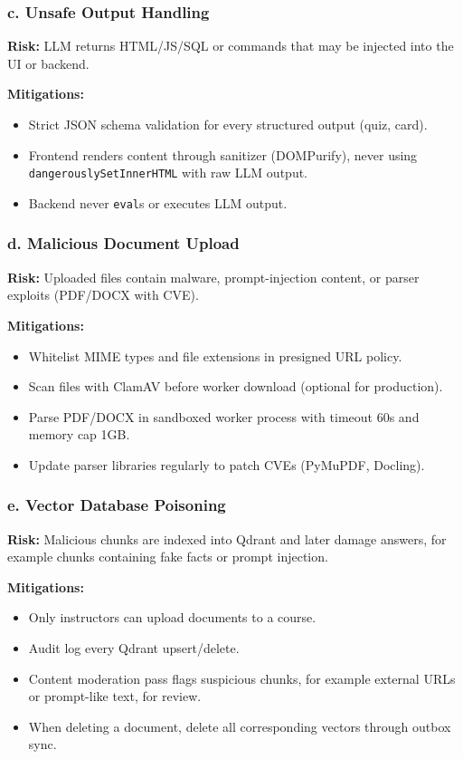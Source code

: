 \subsubsection*{c. Unsafe Output Handling}

\textbf{Risk:} LLM returns HTML/JS/SQL or commands that may be injected
into the UI or backend.

\textbf{Mitigations:}
\begin{itemize}
    \item Strict JSON schema validation for every structured output (quiz,
          card).
    \item Frontend renders content through sanitizer (DOMPurify), never
          using \texttt{dangerouslySetInnerHTML} with raw LLM output.
    \item Backend never \texttt{eval}s or executes LLM output.
\end{itemize}

\subsubsection*{d. Malicious Document Upload}

\textbf{Risk:} Uploaded files contain malware, prompt-injection content,
or parser exploits (PDF/DOCX with CVE).

\textbf{Mitigations:}
\begin{itemize}
    \item Whitelist MIME types and file extensions in presigned URL policy.
    \item Scan files with ClamAV before worker download (optional for
          production).
    \item Parse PDF/DOCX in sandboxed worker process with timeout 60s and
          memory cap 1GB.
    \item Update parser libraries regularly to patch CVEs (PyMuPDF,
          Docling).
\end{itemize}

\subsubsection*{e. Vector Database Poisoning}

\textbf{Risk:} Malicious chunks are indexed into Qdrant and later damage
answers, for example chunks containing fake facts or prompt injection.

\textbf{Mitigations:}
\begin{itemize}
    \item Only instructors can upload documents to a course.
    \item Audit log every Qdrant upsert/delete.
    \item Content moderation pass flags suspicious chunks, for example
          external URLs or prompt-like text, for review.
    \item When deleting a document, delete all corresponding vectors
          through outbox sync.
\end{itemize}

